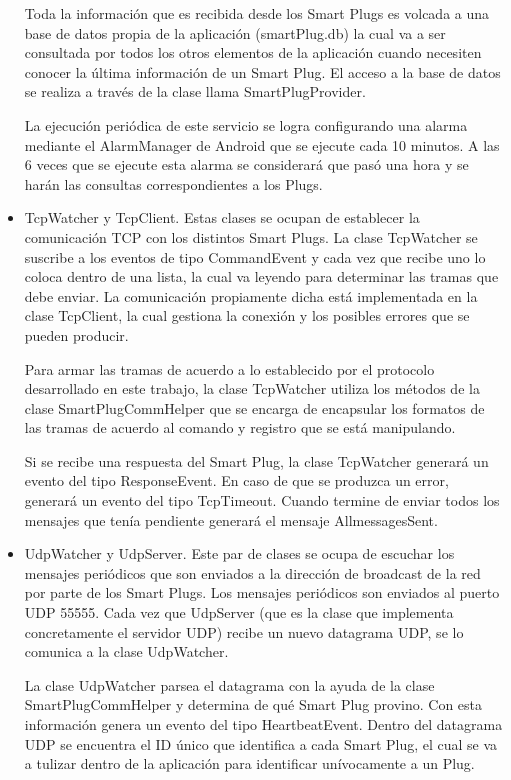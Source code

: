 \begin{itemize}
Toda la información que es recibida desde los Smart Plugs es volcada a una base de datos propia de la aplicación (smartPlug.db) la cual va a ser consultada por todos los otros elementos de la aplicación cuando necesiten conocer la última información de un Smart Plug. El acceso a la base de datos se realiza a través de la clase llama SmartPlugProvider.

La ejecución periódica de este servicio se logra configurando una alarma mediante el AlarmManager de Android que se ejecute cada 10 minutos. A las 6 veces que se ejecute esta alarma se considerará que pasó una hora y se harán las consultas correspondientes a los Plugs.


\item TcpWatcher y TcpClient. Estas clases se ocupan de establecer la comunicación TCP con los distintos Smart Plugs. La clase TcpWatcher se suscribe a los eventos de tipo CommandEvent y cada vez que recibe uno lo coloca dentro de una lista, la cual va leyendo para determinar las tramas que debe enviar. La comunicación propiamente dicha está implementada en la clase TcpClient, la cual gestiona la conexión y los posibles errores que se pueden producir. 

Para armar las tramas de acuerdo a lo establecido por el protocolo desarrollado en este trabajo, la clase TcpWatcher utiliza los métodos de la clase SmartPlugCommHelper que se encarga de encapsular los formatos de las tramas de acuerdo al comando y registro que se está manipulando.

Si se recibe una respuesta del Smart Plug, la clase TcpWatcher generará un evento del tipo ResponseEvent. En caso de que se produzca un error, generará un evento del tipo TcpTimeout. Cuando termine de enviar todos los mensajes que tenía pendiente generará el mensaje AllmessagesSent.

\item UdpWatcher y UdpServer. Este par de clases se ocupa de escuchar los mensajes periódicos que son enviados a la dirección de broadcast de la red por parte de los Smart Plugs. Los mensajes periódicos son enviados al puerto UDP 55555. Cada vez que UdpServer (que es la clase que implementa concretamente el servidor UDP) recibe un nuevo datagrama UDP, se lo comunica a la clase UdpWatcher.

La clase UdpWatcher parsea el datagrama con la ayuda de la clase SmartPlugCommHelper y determina de qué Smart Plug provino. Con esta información genera un evento del tipo HeartbeatEvent. Dentro del datagrama UDP se encuentra el ID único que identifica a cada Smart Plug, el cual se va a tulizar dentro de la aplicación para identificar unívocamente a un Plug.


\end{itemize}
